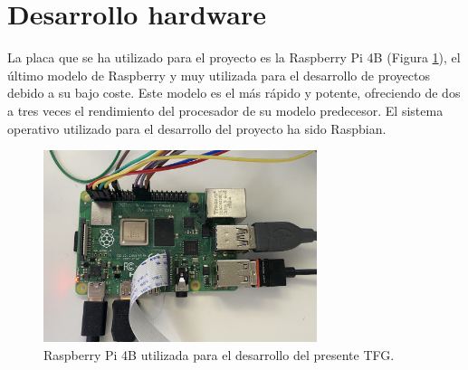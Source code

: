 \section{Desarrollo hardware}
La placa que se ha utilizado para el proyecto es la Raspberry Pi 4B (Figura \ref{fig:rasp}), el último modelo de Raspberry y muy utilizada para el desarrollo de proyectos debido a su bajo coste. Este modelo es el más rápido y potente, ofreciendo de dos a tres veces el rendimiento del procesador de su modelo predecesor. El sistema operativo utilizado para el desarrollo del proyecto ha sido Raspbian.\\
\begin{figure} [h!]
  \begin{center}
    \includegraphics[width=8cm]{figs/raspberry}
  \end{center}
  \caption{Raspberry Pi 4B utilizada para el desarrollo del presente TFG.}
  \label{fig:rasp}
\end{figure}

